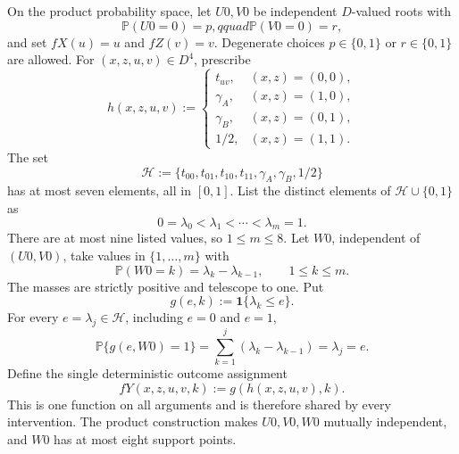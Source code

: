 On the product probability space, let \(U0,V0\) be independent \(D\)-valued roots with
\[
\mathbb P(U0=0)=p,qquad \mathbb P(V0=0)=r,
\]
and set \(fX(u)=u\) and \(fZ(v)=v\).  Degenerate choices \(p\in\{0,1\}\) or \(r\in\{0,1\}\) are allowed.  For \((x,z,u,v)\in D^4\), prescribe
\[
h(x,z,u,v):=
\begin{cases}
t_{uv},&(x,z)=(0,0),\\
\gamma_A,&(x,z)=(1,0),\\
\gamma_B,&(x,z)=(0,1),\\
1/2,&(x,z)=(1,1).
\end{cases}
\]
The set
\[
\mathcal H:=\{t_{00},t_{01},t_{10},t_{11},\gamma_A,\gamma_B,1/2\}
\]
has at most seven elements, all in \([0,1]\).  List the distinct elements of \(\mathcal H\cup\{0,1\}\) as
\[
0=\lambda_0<\lambda_1<\cdots<\lambda_m=1.
\]
There are at most nine listed values, so \(1\le m\le8\).  Let \(W0\), independent of \((U0,V0)\), take values in \(\{1,\ldots,m\}\) with
\[
\mathbb P(W0=k)=\lambda_k-\lambda_{k-1},
\qquad 1\le k\le m.
\]
The masses are strictly positive and telescope to one.  Put
\[
g(e,k):=\mathbf 1\{\lambda_k\le e\}.
\]
For every \(e=\lambda_j\in\mathcal H\), including \(e=0\) and \(e=1\),
\[
\mathbb P\{g(e,W0)=1\}
=\sum_{k=1}^{j}(\lambda_k-\lambda_{k-1})
=\lambda_j=e.
\]
Define the single deterministic outcome assignment
\[
fY(x,z,u,v,k):=g(h(x,z,u,v),k).
\]
This is one function on all arguments and is therefore shared by every intervention.  The product construction makes \(U0,V0,W0\) mutually independent, and \(W0\) has at most eight support points.

